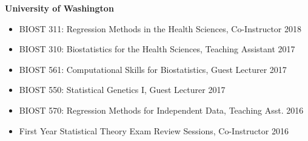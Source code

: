 \documentclass[margin]{res}
\begin{document}
\begin{resume}
\textbf{University of Washington}
\begin{itemize}
\item BIOST 311: Regression Methods in the Health Sciences, Co-Instructor \hfill  2018 
\item BIOST 310: Biostatistics for the Health Sciences, Teaching Assistant \hfill 2017 
\item BIOST 561: Computational Skills for Biostatistics, Guest Lecturer \hfill 2017
\item BIOST 550: Statistical Genetics I, Guest Lecturer \hfill 2017 
\item BIOST 570: Regression Methods for Independent Data, Teaching Asst. \hfill 2016 
\item First Year Statistical Theory Exam Review Sessions, Co-Instructor \hfill 2016 \\
\end{itemize}



\end{resume}
\end{document}
